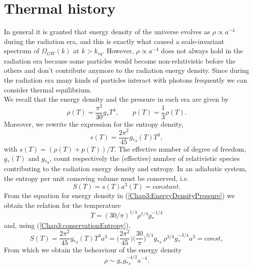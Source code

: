 \documentclass[11pt,a4paper,twoside]{book}
\begin{document}
\section{Thermal history}
In general it is granted that energy density of the universe evolves as $ \rho \propto a^{-4} $ during the radiation era, and this is exactly what caused a scale-invariant spectrum of $ \Omega_{GW}(k) $ at $ k > k_{eq}  $. However, $\rho \propto a^{-4}$ does not always hold in the radiation era because some particles would become non-relativistic before the others and don't contribute anymore to the radiation energy density. Since during the radiation era many kinds of particles interact with photons frequently we can consider thermal equilibrium.\\
We recall that the energy density and the pressure in such era are given by 
\begin{equation}
\label{Chap3:EnergyDensityPressure}
 \rho(T)= \frac{\pi^{2}}{30}g_{*}T^{4} ,  
 \qquad
 p(T)=\frac{1}{3}\rho(T).
\end{equation}	
Moreover, we rewrite the expression for the entropy density,
\begin{equation}
	\label{Chap3:entropy}
	s(T)=\frac{2\pi^{2}}{45}g_{*s}(T)T^{3},
\end{equation}
with $ s(T) =(\rho(T) + p(T))/T $. The effective number of degree of freedom, $ g_{*}(T) $ and $ g_{*s} $, count respectively the (effective) number of relativistic species contributing to the radiation energy density and entropy. In an adiabatic system, the entropy per unit comoving volume must be conserved, i.e. 
\begin{equation}
	\label{Chap3:conservationEntropy}
	S(T) = s(T)a^{3}(T) = constant.
\end{equation}
From the equation for energy density in (\ref{Chap3:EnergyDensityPressure}) we obtain the relation for the temperature
\begin{equation}
\label{Chap3:DependenceTemperature}
T = (30/\pi)^{1/4} \rho^{1/4}g_{*}^{-1/4} 
\end{equation}
and, using (\ref{Chap3:conservationEntropy}),
\begin{equation}
	S(T)=\frac{2\pi^{2}}{45}g_{*s}(T)T^{3}a^{3} = \Big (\frac{2\pi^{2}}{45}\Big)\Big(\frac{30}{\pi}\Big)^{3/4} g_{*s}\ \rho^{3/4}g_{*}^{-3/4}a^{3} = const,
\end{equation}
From which we obtain the beheaviour of the energy density
\begin{equation}
	\label{Chap3:DependenceEnergyDensity}
	\rho \sim g_{*}g_{*s}^{-4/3}a^{-4}.
\end{equation}
\end{document}
